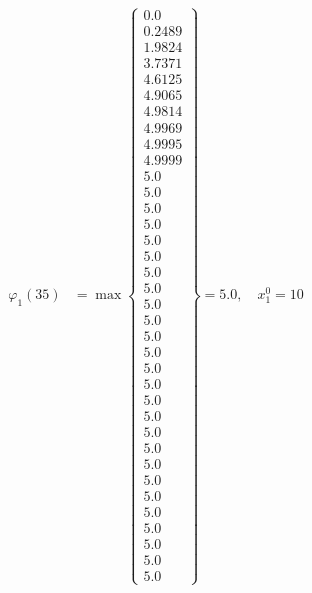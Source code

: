 \documentclass{article}
\begin{document}
\begin{align*}
  
\varphi_{1}(35) &= \max \left\{ \begin{array}{c}
0.0 \\
 0.2489 \\
 1.9824 \\
 3.7371 \\
 4.6125 \\
 4.9065 \\
 4.9814 \\
 4.9969 \\
 4.9995 \\
 4.9999 \\
 5.0 \\
 5.0 \\
 5.0 \\
 5.0 \\
 5.0 \\
 5.0 \\
 5.0 \\
 5.0 \\
 5.0 \\
 5.0 \\
 5.0 \\
 5.0 \\
 5.0 \\
 5.0 \\
 5.0 \\
 5.0 \\
 5.0 \\
 5.0 \\
 5.0 \\
 5.0 \\
 5.0 \\
 5.0 \\
 5.0 \\
 5.0 \\
 5.0 \\
 5.0
\end{array} \right\}=5.0,\quad x_{1}^0=10\\
  
  
  

\end{align*}
\end{document}
